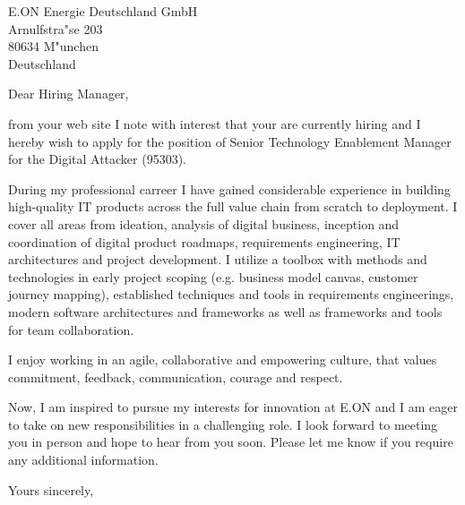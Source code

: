\documentclass[10pt,a4paper]{dinbrief}
\date{\today}
\begin{document}
 
\begin{letter}  
{%
	E.ON Energie Deutschland GmbH\\
	Arnulfstra"se 203\\
	80634 M"unchen\\
	Deutschland	
}
\subject{\bf Job Application Senior Technology Enablement Manager 95303}
\opening{Dear Hiring Manager,}

from your web site I note with interest that your are currently hiring and I hereby wish to apply for the position of Senior Technology Enablement Manager for the Digital Attacker (95303). 

During my professional carreer I have gained considerable experience in building high-quality IT products across the full value chain from scratch to deployment. I cover all areas from ideation, analysis of digital business, inception and coordination of digital product roadmaps, requirements engineering, IT architectures and project development. I utilize a toolbox with methods and technologies in early project scoping (e.g. business model canvas, customer journey mapping), established techniques and tools in requirements engineerings, modern software architectures and frameworks as well as frameworks and tools for team collaboration.

I enjoy working in an agile, collaborative and empowering culture, that values commitment, feedback, communication, courage and respect. 

Now, I am inspired to pursue my interests for innovation at E.ON and I am eager to take on new responsibilities in a challenging role. I look forward to meeting you in person and hope to hear from you soon. Please let me know if you require any additional information.

\closing{Yours sincerely,}
\end{letter}
\end{document}
